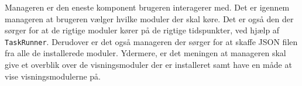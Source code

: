 Manageren er den eneste komponent brugeren interagerer med.
Det er igennem manageren at brugeren vælger hvilke moduler der skal køre.
Det er også den der sørger for at de rigtige moduler kører på de rigtige tidspunkter, ved hjælp af \texttt{TaskRunner}.
Derudover er det også manageren der sørger for at skaffe JSON filen fra alle de installerede moduler.
Ydermere, er det meningen at manageren skal give et overblik over de visningsmoduler der er installeret samt have en måde at vise visningsmodulerne på.